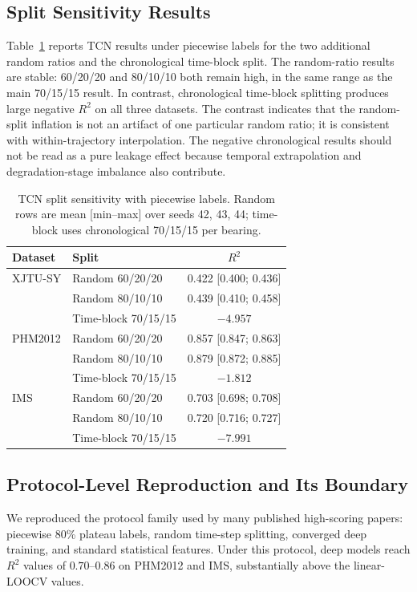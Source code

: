 \documentclass[pdflatex,sn-mathphys-num]{sn-jnl}
\begin{document}
\subsection{Split Sensitivity Results}
Table~\ref{tab:sensitivity} reports TCN results under piecewise labels for the two additional random ratios and the chronological time-block split. The random-ratio results are stable: 60/20/20 and 80/10/10 both remain high, in the same range as the main 70/15/15 result. In contrast, chronological time-block splitting produces large negative $R^2$ on all three datasets. The contrast indicates that the random-split inflation is not an artifact of one particular random ratio; it is consistent with within-trajectory interpolation. The negative chronological results should not be read as a pure leakage effect because temporal extrapolation and degradation-stage imbalance also contribute.

\begin{table}[t]
\centering
\caption{TCN split sensitivity with piecewise labels. Random rows are mean [min--max] over seeds 42, 43, 44; time-block uses chronological 70/15/15 per bearing.}
\label{tab:sensitivity}
\small
\begin{tabular}{llc}
\toprule
Dataset & Split & $R^2$ \\
\midrule
XJTU-SY & Random 60/20/20 & 0.422 [0.400; 0.436] \\
 & Random 80/10/10 & 0.439 [0.410; 0.458] \\
 & Time-block 70/15/15 & $-4.957$ \\
\midrule
PHM2012 & Random 60/20/20 & 0.857 [0.847; 0.863] \\
 & Random 80/10/10 & 0.879 [0.872; 0.885] \\
 & Time-block 70/15/15 & $-1.812$ \\
\midrule
IMS & Random 60/20/20 & 0.703 [0.698; 0.708] \\
 & Random 80/10/10 & 0.720 [0.716; 0.727] \\
 & Time-block 70/15/15 & $-7.991$ \\
\bottomrule
\end{tabular}
\end{table}

\subsection{Protocol-Level Reproduction and Its Boundary}
We reproduced the protocol family used by many published high-scoring papers: piecewise 80\% plateau labels, random time-step splitting, converged deep training, and standard statistical features. Under this protocol, deep models reach $R^2$ values of $0.70$--$0.86$ on PHM2012 and IMS, substantially above the linear-LOOCV values.
\end{document}
